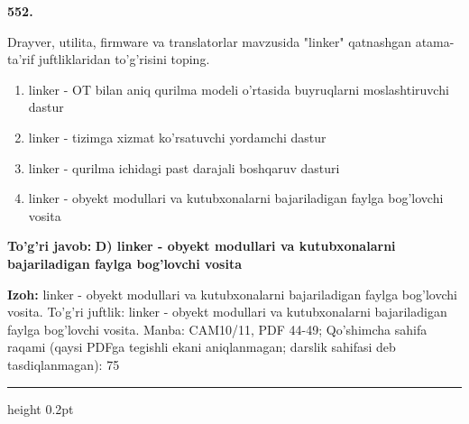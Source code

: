 \documentclass[10pt,a4paper]{article}
\begin{document}
{\bfseries\sffamily\color{ink} 552.}
\par
Drayver, utilita, firmware va translatorlar mavzusida "linker" qatnashgan atama-ta'rif juftliklaridan to'g'risini toping.
\begin{enumerate}[label=\Alph*),leftmargin=9mm]
\item linker - OT bilan aniq qurilma modeli o'rtasida buyruqlarni moslashtiruvchi dastur
\item linker - tizimga xizmat ko'rsatuvchi yordamchi dastur
\item linker - qurilma ichidagi past darajali boshqaruv dasturi
\item linker - obyekt modullari va kutubxonalarni bajariladigan faylga bog'lovchi vosita
\end{enumerate}
\begin{tcolorbox}[enhanced,breakable,colback=teal!4,colframe=teal!60!black,boxrule=0.45pt,arc=1.2mm,left=2.7mm,right=2.7mm,top=1.8mm,bottom=1.8mm,before skip=2mm,after skip=2mm]
{\bfseries\sffamily\color{teal}To'g'ri javob:} \textbf{D) linker - obyekt modullari va kutubxonalarni bajariladigan faylga bog'lovchi vosita}
\par\smallskip
{\bfseries Izoh:} linker - obyekt modullari va kutubxonalarni bajariladigan faylga bog'lovchi vosita. To'g'ri juftlik: linker - obyekt modullari va kutubxonalarni bajariladigan faylga bog'lovchi vosita. Manba: CAM10/11, PDF 44-49; Qo'shimcha sahifa raqami (qaysi PDFga tegishli ekani aniqlanmagan; darslik sahifasi deb tasdiqlanmagan): 75
\end{tcolorbox}
\vspace{2mm}\hrule height 0.2pt\vspace{3mm}
\end{document}
